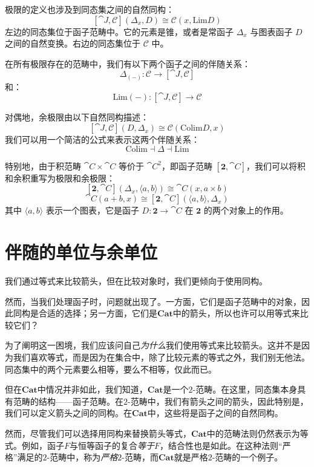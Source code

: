 \documentclass[DaoFP]{subfiles}
\begin{document}
极限的定义也涉及到同态集之间的自然同构：
\[ [\cat J, \mathcal{C}](\Delta_x, D)  \cong \mathcal{C}(x, \text{Lim} D) \]
左边的同态集位于函子范畴中。它的元素是锥，或者是常函子 $\Delta_x$ 与图表函子 $D$ 之间的自然变换。右边的同态集位于 $\mathcal{C}$ 中。

在所有极限存在的范畴中，我们有以下两个函子之间的伴随关系：
\[ \Delta_{(-)} \colon \mathcal{C} \to  [\cat J, \mathcal{C}] \]
和：
\[ \text{Lim}{(-)} \colon  [\cat J, \mathcal{C}] \to \mathcal{C} \]

对偶地，余极限由以下自然同构描述：
\[ [\cat J, \mathcal{C}](D, \Delta_x)  \cong \mathcal{C}( \text{Colim} D, x) \]
我们可以用一个简洁的公式来表示这两个伴随关系：
\[ \text{Colim} \dashv \Delta \dashv \text{Lim}\]

特别地，由于积范畴 $\cat C \times \cat C$ 等价于 $\cat C^2$，即函子范畴 $[\mathbf{2}, \cat C]$，我们可以将积和余积重写为极限和余极限：
\[ [\mathbf{2}, \cat C](\Delta_x, \langle a, b \rangle) \cong \cat C(x, a \times b) \]
\[ \cat C( a + b, x) \cong [\mathbf{2}, \cat C]( \langle a, b \rangle, \Delta_x) \]
其中 $\langle a, b \rangle$ 表示一个图表，它是函子 $D \colon \mathbf{2} \to \cat C$ 在 $\mathbf{2}$ 的两个对象上的作用。

\section{伴随的单位与余单位}

我们通过等式来比较箭头，但在比较对象时，我们更倾向于使用同构。

然而，当我们处理函子时，问题就出现了。一方面，它们是函子范畴中的对象，因此同构是合适的选择；另一方面，它们是$\mathbf{Cat}$中的箭头，所以也许可以用等式来比较它们？

为了阐明这一困境，我们应该问自己\emph{为什么}我们使用等式来比较箭头。这并不是因为我们喜欢等式，而是因为在集合中，除了比较元素的等式之外，我们别无他法。同态集中的两个元素要么相等，要么不相等，仅此而已。

但在$\mathbf{Cat}$中情况并非如此，我们知道，$\mathbf{Cat}$是一个$2$-范畴。在这里，同态集本身具有范畴的结构——函子范畴。在$2$-范畴中，我们有箭头之间的箭头，因此特别是，我们可以定义箭头之间的同构。在$\mathbf{Cat}$中，这些将是函子之间的自然同构。

然而，尽管我们可以选择用同构来替换箭头等式，$\mathbf{Cat}$中的范畴法则仍然表示为等式。例如，函子$F$与恒等函子的复合\emph{等于}$F$，结合性也是如此。在这种法则“严格”满足的$2$-范畴中，称为\emph{严格}$2$-范畴，而$\mathbf{Cat}$就是严格$2$-范畴的一个例子。
\end{document}
